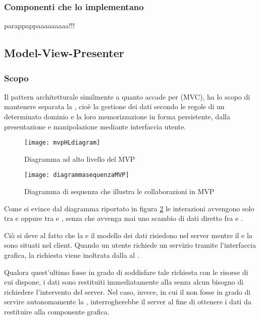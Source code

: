 \subsubsection{Componenti che lo implementano}
parappappaaaaaaaaa!!!

\subsection{Model-View-Presenter}\label{sec:MVP}

\subsubsection{Scopo}
Il pattern architetturale  similmente a quanto accade per  (MVC), ha lo scopo di mantenere separata la , cioè la gestione dei dati secondo le regole di un determinato dominio e la loro memorizzazione in forma persistente, dalla presentazione e manipolazione mediante interfaccia utente.


\begin{figure}[H]
  \centering
  \texttt{[image: mvpHLdiagram]}
  \caption{Diagramma ad alto livello del  MVP}\label{fig:mvpHL}
\end{figure}

\begin{figure}[H]
  \centering
  \texttt{[image: diagrammasequenzaMVP]}
  \caption{Diagramma di sequenza che illustra le collaborazioni in MVP}\label{fig:mvpSD}
\end{figure}

Come si evince dal diagramma riportato in figura \ref{fig:mvpSD} le interazioni avvengono solo tra  e  oppure tra  e , senza che avvenga mai uno scambio di dati diretto fra  e .

Ciò si deve al fatto che la  e il modello dei dati risiedono nel server mentre il  e la  sono situati nel client. Quando un utente richiede un servizio tramite l'interfaccia grafica, la richiesta viene inoltrata dalla  al .

Qualora quest'ultimo fosse in grado di soddisfare tale richiesta con le risorse di cui dispone, i dati sono restituiti immediatamente alla  senza alcun bisogno di richiedere l'intervento del server. Nel caso, invece, in cui il  non fosse in grado di servire autonomamente la , interrogherebbe il server al fine di ottenere i dati da restituire alla componente grafica.

